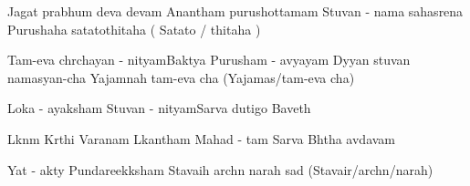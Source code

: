 \documentclass[20pt]{article}
\begin{document}
{Jagat prabhum deva devam } {Anantham purushottamam } 
{Stuvan - nama sahasrena } {Purushaha satatothitaha ( Satato / thitaha ) }

\slokash
{Tam-eva chrchayan - nityam}{Baktya Purusham - avyayam}
{Dyyan stuvan namasyan-cha} {Yajamnah tam-eva cha (Yajamas/tam-eva cha)}


{Loka - ayaksham Stuvan - nityam}{Sarva dutigo Baveth}

 {Lknm Krthi Varanam}
{Lkantham Mahad - tam} {Sarva Bhtha avdavam}

{Yat - akty Pundareekksham} {Stavaih archn narah sad (Stavair/archn/narah)}
\end{document}
